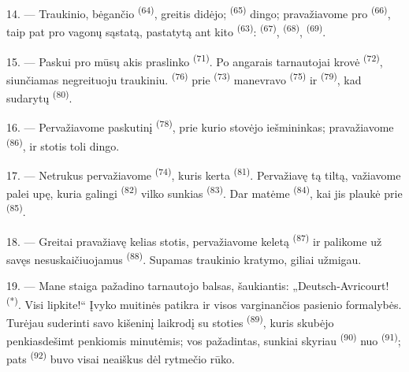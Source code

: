 \VUsaut{3.0mm}
\VUsaut{3.0mm}

14. --- Traukinio, bėgančio  \textsuperscript{(64)}, greitis didėjo;
 \textsuperscript{(65)} dingo; pravažiavome pro 
\textsuperscript{(66)}, taip pat pro vagonų sąstatą, pastatytą ant kito
 \textsuperscript{(63)}: 
\textsuperscript{(67)},  \textsuperscript{(68)},
 \textsuperscript{(69)}.


15. --- Paskui pro mūsų akis praslinko  \textsuperscript{(71)}.
Po angarais tarnautojai krovė  \textsuperscript{(72)}, siunčiamas
negreituoju traukiniu.  \textsuperscript{(76)} prie
 \textsuperscript{(73)} manevravo  \textsuperscript{(75)} ir 
\textsuperscript{(79)}, kad sudarytų  \textsuperscript{(80)}.

16. --- Pervažiavome paskutinį  \textsuperscript{(78)}, prie
kurio stovėjo iešmininkas; pravažiavome 
\textsuperscript{(86)}, ir stotis toli dingo.

17. --- Netrukus pervažiavome  \textsuperscript{(74)}, kuris
kerta  \textsuperscript{(81)}. Pervažiavę tą tiltą, važiavome palei upę,
kuria galingi  \textsuperscript{(82)} vilko sunkias 
\textsuperscript{(83)}. Dar matėme  \textsuperscript{(84)},
kai jis plaukė prie  \textsuperscript{(85)}.

18. --- Greitai pravažiavę kelias stotis, pervažiavome keletą 
\textsuperscript{(87)} ir palikome už savęs nesuskaičiuojamus 
 \textsuperscript{(88)}. Supamas traukinio kratymo, giliai užmigau.

\VUsaut{3.0mm}
\VUsaut{3.0mm}

19. --- Mane staiga pažadino tarnautojo balsas, šaukiantis: „Deutsch-Avricourt!
\textsuperscript{(*)}. Visi lipkite!“ Įvyko muitinės patikra ir visos varginančios
pasienio formalybės. Turėjau suderinti savo kišeninį laikrodį su stoties
 \textsuperscript{(89)}, kuris skubėjo penkiasdešimt penkiomis
minutėmis; vos pažadintas, sunkiai skyriau 
\textsuperscript{(90)} nuo  \textsuperscript{(91)}; pats
 \textsuperscript{(92)} buvo visai neaiškus dėl rytmečio rūko.

